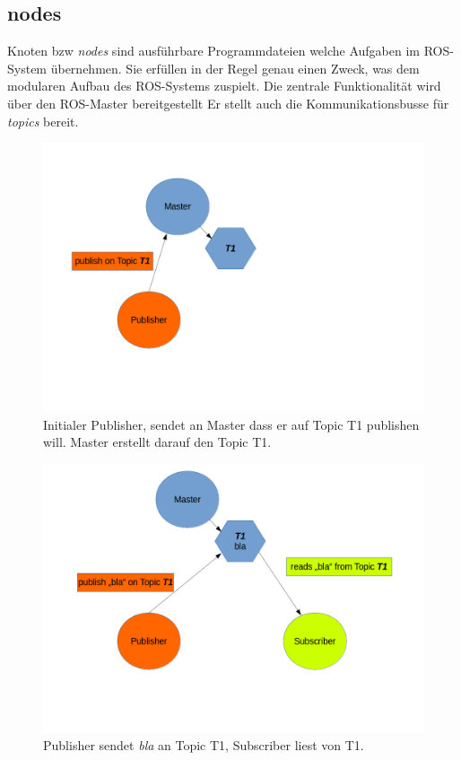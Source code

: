 		\subsection{nodes}
		Knoten bzw \textit{nodes} sind ausführbare Programmdateien welche Aufgaben im ROS-System übernehmen. Sie erfüllen in der Regel genau einen Zweck, was dem modularen Aufbau des ROS-Systems zuspielt. Die zentrale Funktionalität wird über den ROS-Master bereitgestellt Er stellt auch die Kommunikationsbusse für \textit{topics} bereit.
		\begin{figure}[H]
		\centering
		\includegraphics[width=0.7\linewidth]{../media/pub_sub-1}
		\caption{Initialer Publisher, sendet an Master dass er auf Topic T1 publishen will. Master erstellt darauf den Topic T1.}
		\label{fig:pub_sub-1}
		\end{figure}
		\begin{figure}[H]
		\centering
		\includegraphics[width=0.7\linewidth]{../media/pub_sub-2}
		\caption{Publisher sendet \textit{bla} an Topic T1, Subscriber liest von T1.}
		\label{fig:pub_sub-2}
		\end{figure}
		